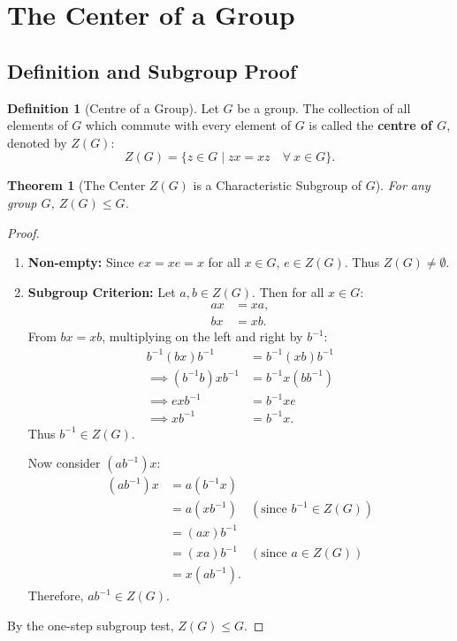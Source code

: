 \documentclass[12pt]{article}
\theoremstyle{definition}
\newtheorem{definition}{Definition}[section]
\theoremstyle{plain}
\newtheorem{theorem}{Theorem}[section]
\begin{document}
\section{The Center of a Group}

\subsection{Definition and Subgroup Proof}

\begin{definition}[Centre of a Group]
Let $G$ be a group. The collection of all elements of $G$ which commute with every element of $G$ is called the \textbf{centre of $G$}, denoted by $Z(G)$:
\[
Z(G) = \{z \in G \mid zx = xz \quad \forall\ x \in G\}.
\]
\end{definition}

\begin{theorem}[The Center $Z(G)$ is a Characteristic Subgroup of $G$]
For any group $G$, $Z(G) \le G$.
\end{theorem}

\begin{proof}
\begin{enumerate}
    \item \textbf{Non-empty:}
    Since $ex = xe = x$ for all $x \in G$, $e \in Z(G)$. Thus $Z(G) \neq \emptyset$.

    \item \textbf{Subgroup Criterion:}
    Let $a, b \in Z(G)$. Then for all $x \in G$:
    \begin{align*}
        ax &= xa, \\
        bx &= xb.
    \end{align*}
    From $bx = xb$, multiplying on the left and right by $b^{-1}$:
    \begin{align*}
        b^{-1}(bx)b^{-1} &= b^{-1}(xb)b^{-1} \\
        \implies (b^{-1}b)x b^{-1} &= b^{-1}x (b b^{-1}) \\
        \implies e x b^{-1} &= b^{-1}x e \\
        \implies xb^{-1} &= b^{-1}x.
    \end{align*}
    Thus $b^{-1} \in Z(G)$.

    Now consider $(ab^{-1})x$:
    \begin{align*}
        (ab^{-1})x &= a(b^{-1}x) \\
        &= a(xb^{-1}) \quad (\text{since } b^{-1} \in Z(G)) \\
        &= (ax)b^{-1} \\
        &= (xa)b^{-1} \quad (\text{since } a \in Z(G)) \\
        &= x(ab^{-1}).
    \end{align*}
    Therefore, $ab^{-1} \in Z(G)$.
\end{enumerate}
By the one-step subgroup test, $\boxed{Z(G) \le G}$.
\end{proof}
\end{document}
